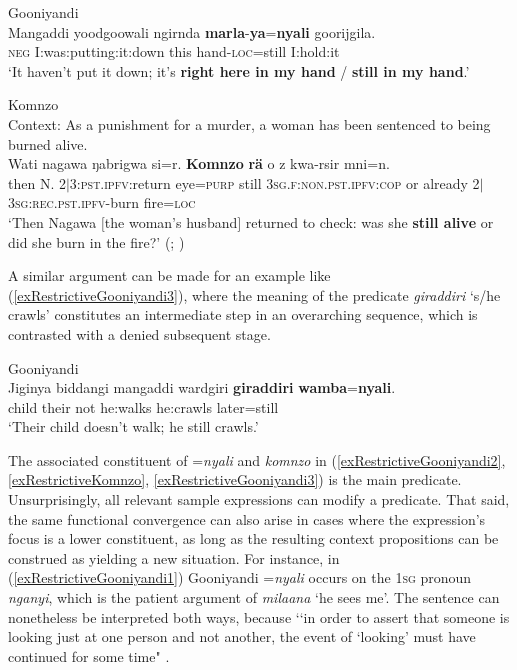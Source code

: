 \begin{exe}
	 Gooniyandi\\
	\gll Mangaddi yoodgoowali ngirnda \textbf{marla}-\textbf{ya}=\textbf{nyali} goorijgila.\\
	\textsc{neg} I:was:putting:it:down this hand-\textsc{loc}=still I:hold:it\\
	\glt \lq It haven’t put it down; it’s \textbf{right here in my hand} / \textbf{still in my hand}.\rq{ }\parencite[465–466]{McGregor1990}
 
	\ex Komnzo\\
	Context: As a punishment for a murder, a woman has been sentenced to being burned alive.\label{exRestrictiveKomnzo}\\
	\gll Wati nagawa ŋabrigwa si=r. \textbf{Komnzo} \textbf{rä} o z kwa-rsir mni=n.\\
	then N. 2$|$3:\textsc{pst.ipfv}:return eye=\textsc{purp} still 3\textsc{sg.f}:\textsc{non.pst.ipfv}:\textsc{cop} or already 2$|$3\textsc{sg}:\textsc{rec}.\textsc{pst}.\textsc{ipfv}-burn fire=\textsc{loc}\\
	\glt \lq Then Nagawa $[$the woman's husband$]$ returned to check: was she \textbf{still alive} or did she burn in the fire?' (\cite[126]{Doehler2018}; \cite{Doehler2020})
\end{exe}

A similar argument can be made for an example like (\ref{exRestrictiveGooniyandi3}), where the meaning of the predicate \textit{giraddiri} \lq s/he crawls\rq{ }constitutes an intermediate step in an overarching sequence, which is contrasted with a denied subsequent stage.

\begin{exe}
	\ex Gooniyandi\label{exRestrictiveGooniyandi3}\\
	\gll Jiginya biddangi mangaddi wardgiri \textbf{giraddiri} \textbf{wamba}=\textbf{nyali}.\\
	child their not he:walks he:crawls later=still\\
	\glt \lq Their child doesn’t walk; he still crawls.\rq{ }\parencite[464]{McGregor1990}
\end{exe}

The associated constituent of \mbox{=\textit{nyali}} and \textit{komnzo} in  (\ref{exRestrictiveGooniyandi2}, \ref{exRestrictiveKomnzo}, \ref{exRestrictiveGooniyandi3}) is the main predicate. Unsurprisingly, all relevant sample expressions can modify a predicate. That said, the same functional convergence can also arise in cases where the expression's focus is a lower constituent, as long as the resulting context propositions can be construed as yielding a new situation. For instance, in (\ref{exRestrictiveGooniyandi1}) Gooniyandi \mbox{=\textit{nyali}} occurs on the 1\textsc{sg} pronoun \textit{nganyi}, which is the patient argument of \textit{milaana} \lq he sees me'. The sentence can nonetheless be interpreted both ways, because \lq\lq in order to assert that someone is looking just at one person and not another, the event of \lq looking' must have continued for some time" \parencite[254]{SchultzeBerndt2002}. 

